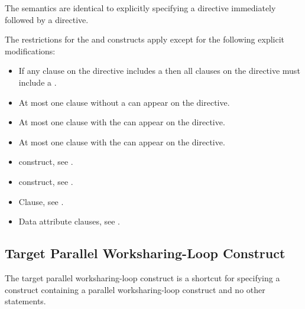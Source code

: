 \descr
The semantics are identical to explicitly specifying a  directive
immediately followed by a  directive.

\restrictions

The restrictions for the  and  constructs apply except for the following explicit modifications:

\begin{itemize}
\item If any  clause on the directive includes a
       then all  clauses
      on the directive must include a .

\item At most one  clause without a
       can appear on the directive.

\item At most one  clause with the 
       can appear on the directive.


\item At most one  clause with the 
       can appear on the directive.
\end{itemize}

\crossreferences
\begin{itemize}
\item {} construct, see
.

\item {} construct, see
.

\item {} Clause, see .

\item Data attribute clauses, see
.
\end{itemize}










\subsection{Target Parallel Worksharing-Loop Construct}
\label{subsec:Target Parallel Worksharing-Loop Construct}
\summary
The target parallel worksharing-loop construct is a shortcut for specifying a 
construct containing a parallel worksharing-loop construct and no other statements.

